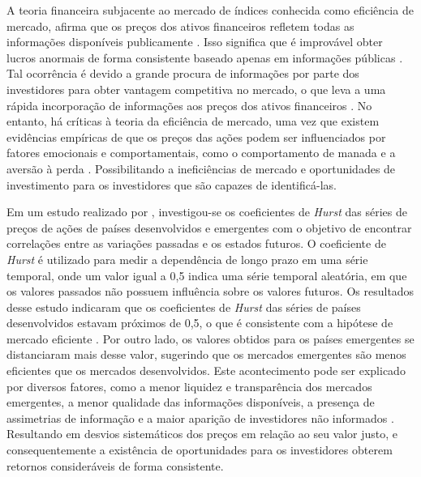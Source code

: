 A teoria financeira subjacente ao mercado de índices conhecida como eficiência de mercado, afirma que os preços dos ativos financeiros refletem todas as informações disponíveis publicamente \cite{Paul_Proof}. Isso significa que é improvável obter lucros anormais de forma consistente baseado apenas em informações públicas \cite{MALKIEL2003}. Tal ocorrência é devido a grande procura de informações por parte dos investidores para obter vantagem competitiva no mercado, o que leva a uma rápida incorporação de informações aos preços dos ativos financeiros \cite{Fama_EFFICIENT}. 
No entanto, há críticas à teoria da eficiência de mercado, uma vez que existem evidências empíricas de que os preços das ações podem ser influenciados por fatores emocionais e comportamentais, como o comportamento de manada e a aversão à perda \cite{Shiller2000}. Possibilitando a ineficiências de mercado e oportunidades de investimento para os investidores que são capazes de identificá-las.

Em um estudo realizado por , investigou-se os coeficientes de \textit{Hurst} das séries de preços de ações de países desenvolvidos e emergentes com o objetivo de encontrar correlações entre as variações passadas e os estados futuros. O coeficiente de \textit{Hurst} é utilizado para medir a dependência de longo prazo em uma série temporal, onde um valor igual a 0,5 indica uma série temporal aleatória, em que os valores passados não possuem influência sobre os valores futuros. 
Os resultados desse estudo indicaram que os coeficientes de \textit{Hurst} das séries de países desenvolvidos estavam próximos de 0,5, o que é consistente com a hipótese de mercado eficiente \cite{mussa2010hipotese}. Por outro lado, os valores obtidos para os países emergentes se distanciaram mais desse valor, sugerindo que os mercados emergentes são menos eficientes que os mercados desenvolvidos.
Este acontecimento pode ser explicado por diversos fatores, como a menor liquidez e transparência dos mercados emergentes, a menor qualidade das informações disponíveis, a presença de assimetrias de informação e a maior aparição de investidores não informados \cite{BARBERIS1998307}. Resultando em desvios sistemáticos dos preços em relação ao seu valor justo, e consequentemente a existência de oportunidades para os investidores obterem retornos consideráveis de forma consistente. 

